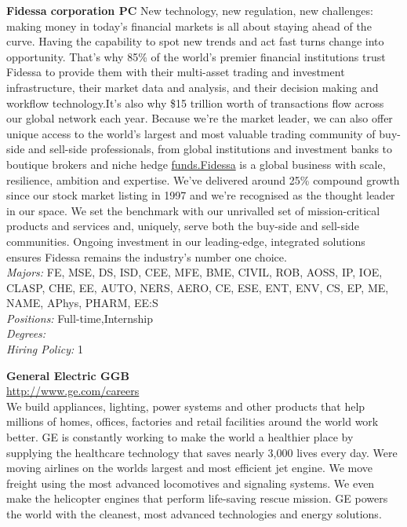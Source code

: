 \documentclass[twoside]{article}
\begin{document}
\begin{center}
\begin{multicols}{2}
\begin{minipage}{.95\columnwidth}{\Large\bf Fidessa corporation \hfill PC}
    New technology, new regulation, new challenges: making money in today's financial markets is all about staying ahead of the curve. Having the capability to spot new trends and act fast turns change into opportunity. That's why 85\% of the world's premier financial institutions trust Fidessa to provide them with their multi-asset trading and investment infrastructure, their market data and analysis, and their decision making and workflow technology.It's also why \$15 trillion worth of transactions flow across our global network each year. Because we're the market leader, we can also offer unique access to the world's largest and most valuable trading community of buy-side and sell-side professionals, from global institutions and investment banks to boutique brokers and niche hedge \url{funds.Fidessa} is a global business with scale, resilience, ambition and expertise. We've delivered around 25\% compound growth since our stock market listing in 1997 and we're recognised as the thought leader in our space. We set the benchmark with our unrivalled set of mission-critical products and services and, uniquely, serve both the buy-side and sell-side communities. Ongoing investment in our leading-edge, integrated solutions ensures Fidessa remains the industry's number one choice.\\
    \emph{Majors:} FE, MSE, DS, ISD, CEE, MFE, BME, CIVIL, ROB, AOSS, IP, IOE, CLASP, CHE, EE, AUTO, NERS, AERO, CE, ESE, ENT, ENV, CS, EP, ME, NAME, APhys, PHARM, EE:S\\
    \emph{Positions:} Full-time,Internship\\
    \emph{Degrees:} \\
    \emph{Hiring Policy:} 1\\
\end{minipage}
 \begin{minipage}{.95\columnwidth}{\Large\bf General Electric \hfill GGB}\\
    \url{http://www.ge.com/careers}\\
    We build appliances, lighting, power systems and other products that help millions of homes, offices, factories and retail facilities around the world work better. GE is constantly working to make the world a healthier place by supplying the healthcare technology that saves nearly 3,000 lives every day. Were moving airlines on the worlds largest and most efficient jet engine. We move freight using the most advanced locomotives and signaling systems. We even make the helicopter engines that perform life-saving rescue mission. GE powers the world with the cleanest, most advanced technologies and energy solutions.\\

\end{minipage}
\end{multicols}
\end{center}
\end{document}
